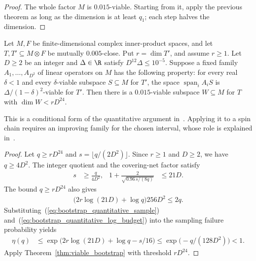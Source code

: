 \begin{proof}
    \leanok
    The whole factor $M$ is $0.015$-viable. Starting from it, apply the
    previous theorem as long as the dimension is at least $q_1$; each step
    halves the dimension.
\end{proof}

\begin{theorem}
    \label{thm:viable_bootstrap_quantitative_dimension}
    \leanok
    Let $M,F$ be finite-dimensional complex inner-product spaces, and let
    $T,T'\subseteq M\otimes F$ be mutually $0.005$-close. Put
    $r=\dim T'$, and assume $r\ge1$. Let $D\ge2$ be an integer and
    $\Delta\in\R$ satisfy $D^{12}\Delta\le10^{-5}$. Suppose a fixed family
    $A_1,\ldots,A_{D^2}$ of linear operators on $M$ has the following property:
    for every real $\delta<1$ and every $\delta$-viable subspace
    $S\subseteq M$ for $T'$, the space $\operatorname{span}_i A_iS$ is
    $\Delta/(1-\delta)^2$-viable for $T'$.
    Then there is a $0.015$-viable subspace $W\subseteq M$ for $T$ with
    $\dim W<rD^{24}$.

    This is a conditional form of the quantitative argument
    in~\cite[lines 1062--1075]{Arad2016RigorousRG}. Applying it to a spin
    chain requires an improving family for the chosen interval, whose role
    is explained in~\cite{gap:alvv16_bootstrap_constants}.
\end{theorem}
\begin{proof}\leanok
    Let $q\ge rD^{24}$ and $s=\lfloor q/(2D^2)\rfloor$.
    Since $r\ge1$ and $D\ge2$, we have $q\ge4D^2$. The integer quotient
    and the covering-net factor satisfy
    \begin{align}
        s                               & \ge\frac{q}{4D^2}, &
        1+\frac{2}{\sqrt{0.96\,s/(8q)}} & \le21D.
        \label{eq:bootstrap_quantitative_sample}
    \end{align}
    The bound $q\ge rD^{24}$ also gives
    \begin{align}
        \bigl(2r\log(21D)+\log q\bigr)256D^2\le2q.
        \label{eq:bootstrap_quantitative_log_budget}
    \end{align}
    Substituting~(\ref{eq:bootstrap_quantitative_sample})
    and~(\ref{eq:bootstrap_quantitative_log_budget}) into the sampling
    failure probability yields
    \begin{align}
        \eta(q) & \le\exp\bigl(2r\log(21D)+\log q-s/16\bigr)
        \le\exp\bigl(-q/(128D^2)\bigr)<1.
        \label{eq:bootstrap_quantitative_failure}
    \end{align}
    Apply Theorem~\ref{thm:viable_bootstrap} with threshold $rD^{24}$.
\end{proof}

